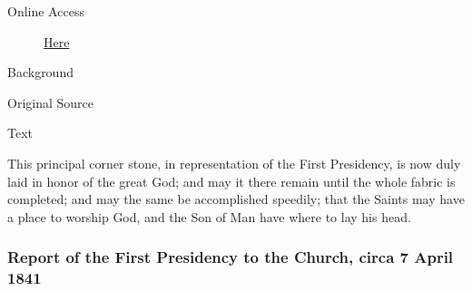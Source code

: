 			\begin{description}
				\item[Online Access] \href{https://www.josephsmithpapers.org/paper-summary/benediction-6april-1841/1}{Here}
			\end{description}
			
			\begin{description}
				\item[Background]
			\end{description}
			
			
			\begin{description}
				\item[Original Source]
			\end{description}
			
			
			\begin{description}
				\item[Text]
			\end{description}
			
				This principal corner stone, in representation of the First Presidency, is now duly laid in honor of the great God; and may it there remain until the whole fabric is completed; and may the same be accomplished speedily; that the Saints may have a place to worship God, and the Son of Man have where to lay his head.
				
		\subsubsection{Report of the First Presidency to the Church, circa 7 April 1841}
			\label{EMS-1841-JS-CIR-7-APR-1841}
			
